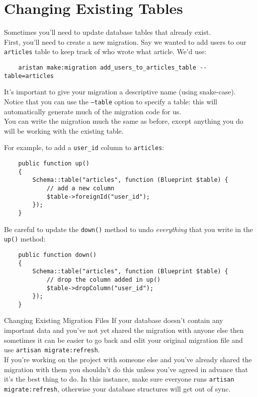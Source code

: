 \section{Changing Existing Tables}

Sometimes you'll need to update database tables that already exist.
\\

First, you'll need to create a new migration. Say we wanted to add users to our \texttt{articles} table to keep track of who wrote what article. We'd use:

\begin{verbatim}
    aristan make:migration add_users_to_articles_table --table=articles
\end{verbatim}

It's important to give your migration a descriptive name (using snake-case). Notice that you can use the \texttt{--table} option to specify a table: this will automatically generate much of the migration code for us.
\\

You can write the migration much the same as before, except anything you do will be working with the existing table.

\pagebreak

For example, to add a \texttt{user\_id} column to \texttt{articles}:

\begin{verbatim}
    public function up()
    {
        Schema::table("articles", function (Blueprint $table) {
            // add a new column
            $table->foreignId("user_id");
        });
    }
\end{verbatim}

Be careful to update the \texttt{down()} method to undo \textit{everything} that you write in the \texttt{up()} method:

\begin{verbatim}
    public function down()
    {
        Schema::table("articles", function (Blueprint $table) {
            // drop the column added in up()
            $table->dropColumn("user_id");
        });
    }
\end{verbatim}


\begin{infobox}{Changing Existing Migration Files}
    If your database doesn't contain any important data and you've not yet shared the migration with anyone else then sometimes it can be easier to go back and edit your original migration file and use \texttt{artisan migrate:refresh}.
    \\

    If you're working on the project with someone else and you've already shared the migration with them you shouldn't do this unless you've agreed in advance that it's the best thing to do. In this instance, make sure everyone runs \texttt{artisan migrate:refresh}, otherwise your database structures will get out of sync.
\end{infobox}


